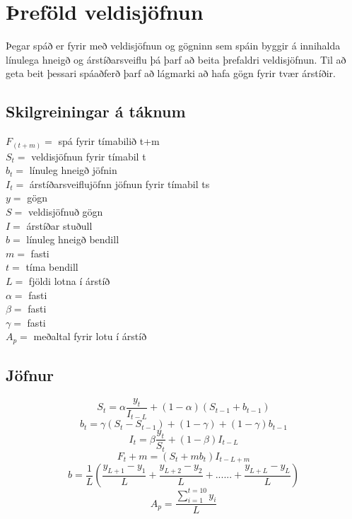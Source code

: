 \section {Þreföld veldisjöfnun}
 

Þegar spáð er fyrir með veldisjöfnun og gögninn sem spáin byggir á innihalda línulega hneigð og árstíðarsveiflu þá þarf að beita þrefaldri veldisjöfnun. Til að geta beit þessari spáaðferð þarf að lágmarki að hafa gögn fyrir tvær árstíðir.\cite{HoltWinters}

\subsection{Skilgreiningar á táknum}
	$F_(t+m)=$ spá fyrir tímabilið  t+m \\
	$S_t =$  veldisjöfnun fyrir tímabil t\\ 	
	$b_t =$ línuleg hneigð jöfnin \\
	$I_t =$ árstíðarsveiflujöfnn jöfnun fyrir tímabil ts \\
	$y =$ gögn\\
	$S =$ veldisjöfnuð gögn \\
	$I =$	árstíðar stuðull \\
	$b =$ línuleg hneigð bendill \\
	$m =$ fasti	\\
	$t =$ tíma bendill \\
	$L =$ fjöldi lotna í árstíð \\
	$\alpha =$ fasti \\
	$\beta =$ fasti \\
	$\gamma =$ fasti \\
	$A_p =$ meðaltal fyrir lotu í árstíð\\


\subsection{Jöfnur}
	
	
	$$S_t = \alpha\dfrac{y_t}{I_{t - L}} + (1-\alpha)(S_{t-1}+ b_{t-1} ) $$
	$$b_t = \gamma  (S_{t}-S_{t-1})+(1- \gamma) + (1 - \gamma)b_{t-1}$$
	$$I_t = \beta \dfrac{y_t}{S_t} +(1-\beta)I_{t-L} $$
	$$F_t+m = (S_{t} +mb_{t})I_{t-L+m}$$
	$$b= \dfrac{1}{L}(\dfrac{y_{L+1}-y_1}{L} + \dfrac{y_{L+2}-y_2}{L}+......+ \dfrac{y_{L+L}-y_L}{L} ) $$
	$$A_p = \dfrac{\sum_{i=1}^{t=10} y_i}{L} $$